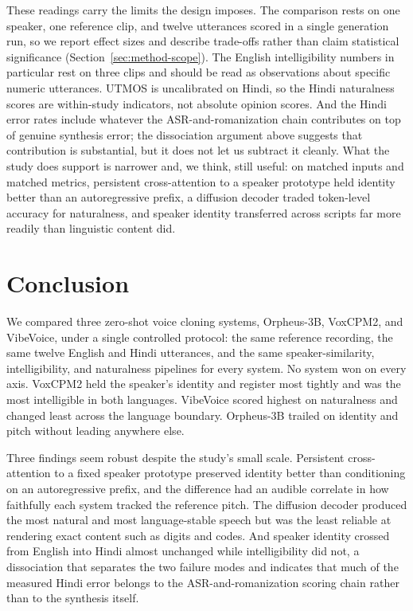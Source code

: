 \documentclass[conference]{IEEEtran}
\begin{document}
These readings carry the limits the design imposes. The comparison rests on
one speaker, one reference clip, and twelve utterances scored in a single
generation run, so we report effect sizes and describe trade-offs rather than
claim statistical significance (Section~\ref{sec:method-scope}). The English
intelligibility numbers in particular rest on three clips and should be read
as observations about specific numeric utterances. UTMOS is uncalibrated on
Hindi, so the Hindi naturalness scores are within-study indicators, not
absolute opinion scores. And the Hindi error rates include whatever the
ASR-and-romanization chain contributes on top of genuine synthesis error; the
dissociation argument above suggests that contribution is substantial, but it
does not let us subtract it cleanly. What the study does support is narrower
and, we think, still useful: on matched inputs and matched metrics,
persistent cross-attention to a speaker prototype held identity better than
an autoregressive prefix, a diffusion decoder traded token-level accuracy for
naturalness, and speaker identity transferred across scripts far more readily
than linguistic content did.

\section{Conclusion}
\label{sec:conclusion}

We compared three zero-shot voice cloning systems, Orpheus-3B, VoxCPM2, and
VibeVoice, under a single controlled protocol: the same reference recording,
the same twelve English and Hindi utterances, and the same
speaker-similarity, intelligibility, and naturalness pipelines for every
system. No system won on every axis. VoxCPM2 held the speaker's identity and
register most tightly and was the most intelligible in both languages.
VibeVoice scored highest on naturalness and changed least across the language
boundary. Orpheus-3B trailed on identity and pitch without leading anywhere
else.

Three findings seem robust despite the study's small scale. Persistent
cross-attention to a fixed speaker prototype preserved identity better than
conditioning on an autoregressive prefix, and the difference had an audible
correlate in how faithfully each system tracked the reference pitch. The
diffusion decoder produced the most natural and most language-stable speech
but was the least reliable at rendering exact content such as digits and
codes. And speaker identity crossed from English into Hindi almost unchanged
while intelligibility did not, a dissociation that separates the two failure
modes and indicates that much of the measured Hindi error belongs to the
ASR-and-romanization scoring chain rather than to the synthesis itself.
\end{document}
